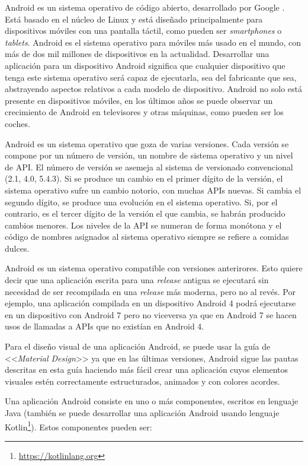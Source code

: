 Android es un sistema operativo de código abierto, desarrollado por Google \cite{27}. Está basado en el núcleo de Linux y está diseñado principalmente para dispositivos móviles con una pantalla táctil, como pueden ser \textit{smartphones} o \textit{tablets}. Android es el sistema operativo para móviles más usado en el mundo, con más de dos mil millones de dispositivos en la actualidad. Desarrollar una aplicación para un dispositivo Android significa que cualquier dispositivo que tenga este sistema operativo será capaz de ejecutarla, sea del fabricante que sea, abstrayendo aspectos relativos a cada modelo de dispositivo. Android no solo está presente en dispositivos móviles, en los últimos años se puede observar un crecimiento de Android en televisores y otras máquinas, como pueden ser los coches.

Android es un sistema operativo que goza de varias versiones. Cada versión se compone por un número de versión, un nombre de sistema operativo y un nivel de \ac{API}. El número de versión se asemeja al sistema de versionado convencional (2.1, 4.0, 5.4.3). Si se produce un cambio en el primer dígito de la versión, el sistema operativo sufre un cambio notorio, con muchas \ac{API}s nuevas. Si cambia el segundo dígito, se produce una evolución en el sistema operativo. Si, por el contrario, es el tercer dígito de la versión el que cambia, se habrán producido cambios menores. Los niveles de la \ac{API} se numeran de forma monótona y el código de nombres asignados al sistema operativo siempre se refiere a comidas dulces.

Android es un sistema operativo compatible con versiones anterirores. Esto quiere decir que una aplicación escrita para una \textit{release} antigua se ejecutará sin necesidad de ser recompilada en una \textit{release} más moderna, pero no al revés. Por ejemplo, una aplicación compilada en un dispositivo Android 4 podrá ejecutarse en un dispositivo con Android 7 pero no viceversa ya que en Android 7 se hacen usos de llamadas a \ac{API}s que no existían en Android 4.

Para el diseño visual de una aplicación Android, se puede usar la guía de <<\textit{Material Design}>> ya que en las últimas versiones, Android sigue las pautas descritas en esta guía haciendo más fácil crear una aplicación cuyos elementos visuales estén correctamente estructurados, animados y con colores acordes.

Una aplicación Android consiste en uno o más componentes, escritos en lenguaje Java (también se puede desarrollar una aplicación Android usando lenguaje Kotlin\footnote{\url{https://kotlinlang.org}}). Estos componentes pueden ser:

